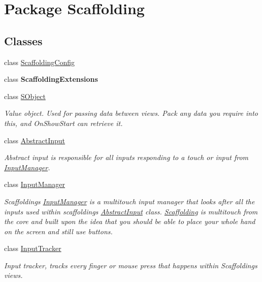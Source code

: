 \hypertarget{namespace_scaffolding}{\section{Package Scaffolding}
\label{namespace_scaffolding}
}
\subsection*{Classes}
\begin{DoxyCompactItemize}
\item 
class \hyperlink{class_scaffolding_1_1_scaffolding_config}{Scaffolding\-Config}
\item 
class {\bfseries Scaffolding\-Extensions}
\item 
class \hyperlink{class_scaffolding_1_1_s_object}{S\-Object}
\begin{DoxyCompactList}\small\item\em Value object. Used for passing data between views. Pack any data you require into this, and On\-Show\-Start can retrieve it. \end{DoxyCompactList}\item 
class \hyperlink{class_scaffolding_1_1_abstract_input}{Abstract\-Input}
\begin{DoxyCompactList}\small\item\em Abstract input is responsible for all inputs responding to a touch or input from \hyperlink{class_scaffolding_1_1_input_manager}{Input\-Manager}. \end{DoxyCompactList}\item 
class \hyperlink{class_scaffolding_1_1_input_manager}{Input\-Manager}
\begin{DoxyCompactList}\small\item\em Scaffoldings \hyperlink{class_scaffolding_1_1_input_manager}{Input\-Manager} is a multitouch input manager that looks after all the inputs used within scaffoldings \hyperlink{class_scaffolding_1_1_abstract_input}{Abstract\-Input} class. \hyperlink{namespace_scaffolding}{Scaffolding} is multitouch from the core and built upon the idea that you should be able to place your whole hand on the screen and still use buttons. \end{DoxyCompactList}\item 
class \hyperlink{class_scaffolding_1_1_input_tracker}{Input\-Tracker}
\begin{DoxyCompactList}\small\item\em Input tracker, tracks every finger or mouse press that happens within Scaffoldings views. \end{DoxyCompactList}\item 

\end{DoxyCompactItemize}
